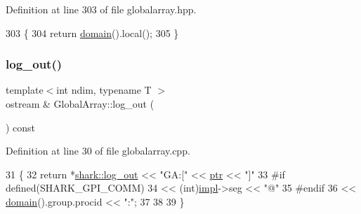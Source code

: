 Definition at line 303 of file globalarray.\+hpp.


\begin{DoxyCode}
303                                                                    \{
304             \textcolor{keywordflow}{return} \hyperlink{classshark_1_1ndim_1_1_global_array_a435ee8ff23c3feadf2ef2be64d4f375c}{domain}().local();
305         \}
\end{DoxyCode}
\hypertarget{classshark_1_1ndim_1_1_global_array_ae56b93f4ac19003102749015275a6d0c}{}\label{classshark_1_1ndim_1_1_global_array_ae56b93f4ac19003102749015275a6d0c} 
\subsubsection{\texorpdfstring{log\+\_\+out()}{log\_out()}}
{\footnotesize\ttfamily template$<$int ndim, typename T $>$ \\
ostream \& Global\+Array\+::log\+\_\+out (\begin{DoxyParamCaption}{ }\end{DoxyParamCaption}) const}



Definition at line 30 of file globalarray.\+cpp.


\begin{DoxyCode}
31 \{
32     \textcolor{keywordflow}{return} *\hyperlink{namespaceshark_a503a509b9d2d2710abe48d6c3338abc0}{shark::log\_out} << \textcolor{stringliteral}{"GA:["} << \hyperlink{classshark_1_1ndim_1_1_global_array_ad4af3b8307a3a7107186cf699b5a2432}{ptr} << \textcolor{stringliteral}{"]"}
33 \textcolor{preprocessor}{#if defined(SHARK\_GPI\_COMM)}
34             << (int)\hyperlink{classshark_1_1ndim_1_1_global_array_a70684121da4badfef791c15d7076282f}{impl}->seg << \textcolor{stringliteral}{"@"}
35 #endif
36             << \hyperlink{classshark_1_1ndim_1_1_global_array_a435ee8ff23c3feadf2ef2be64d4f375c}{domain}().group.procid << \textcolor{stringliteral}{":"};
37 
38 
39 \}
\end{DoxyCode}
\hypertarget{classshark_1_1ndim_1_1_global_array_a63c8f10949e3f8d7ffdf532440190ca1}{}\label{classshark_1_1ndim_1_1_global_array_a63c8f10949e3f8d7ffdf532440190ca1} 
